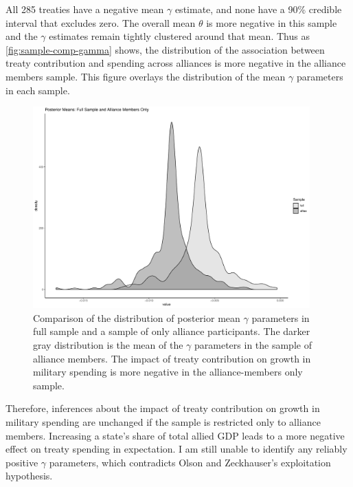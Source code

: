 \documentclass[12pt]{article}
\begin{document}
All 285 treaties have a negative mean $\gamma$ estimate, and none have a 90\% credible interval that excludes zero.
The overall mean $\theta$ is more negative in this sample and the $\gamma$ estimates remain tightly clustered around that mean. 
Thus as \autoref{fig:sample-comp-gamma} shows, the distribution of the association between treaty contribution and spending across alliances is more negative in the alliance members sample. 
This figure overlays the distribution of the mean $\gamma$ parameters in each sample. 


\begin{figure}
	\centering
		\includegraphics[width=0.95\textwidth]{sample-comp-gamma.pdf}
	\caption{Comparison of the distribution of posterior mean $\gamma$ parameters in full sample and a sample of only alliance participants. The darker gray distribution is the mean of the $\gamma$ parameters in the sample of alliance members. The impact of treaty contribution on growth in military spending is more negative in the alliance-members only sample.}
	\label{fig:sample-comp-gamma}
\end{figure}


Therefore, inferences about the impact of treaty contribution on growth in military spending are unchanged if the sample is restricted only to alliance members. 
Increasing a state's share of total allied GDP leads to a more negative effect on treaty spending in expectation. 
I am still unable to identify any reliably positive $\gamma$ parameters, which contradicts Olson and Zeckhauser's exploitation hypothesis. 








\singlespace


 
\end{document}
